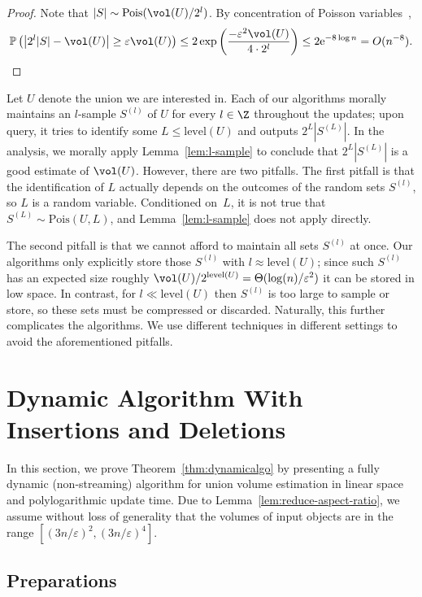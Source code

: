 \documentclass[a4paper, 11pt]{article}
\newcommand{\qedhere}{}
\newcommand{\Pois}{\mathrm{Pois}}
\newcommand{\level}{\mathrm{level}}
\newcommand{\eps}{\varepsilon}
\renewcommand{\Pr}{\mathbb{P}}
\begin{document}
\begin{proof}
    Note that $|S| \sim \Pois(\vol(U)/2^l)$. By concentration of Poisson variables~\cite{Canonne19},
    \[
        \Pr \left( \left| 2^l |S| - \vol(U) \right| \geq \eps \vol(U) \right)
        \leq 2\exp\left( \frac{-\eps^2 \vol(U)}{4 \cdot 2^l} \right)
        \leq 2\mathrm{e}^{-8 \log n} = O(n^{-8}).\qedhere
    \]
    \aftermath
\end{proof}

Let $U$ denote the union we are interested in. Each of our algorithms morally maintains an $l$-sample $S^{(l)}$ of $U$ for every $l \in \Z$ throughout the updates; upon query, it tries to identify some $L \leq \level(U)$ and outputs $2^L |S^{(L)}|$. In the analysis, we morally apply Lemma~\ref{lem:l-sample} to conclude that $2^L |S^{(L)}|$ is a good estimate of $\vol(U)$. However, there are two pitfalls. The first pitfall is that the identification of $L$ actually depends on the outcomes of the random sets $S^{(l)}$, so $L$ is a random variable. Conditioned on~$L$, it is not true that $S^{(L)} \sim \Pois(U, L)$, and Lemma~\ref{lem:l-sample} does not apply directly.

The second pitfall is that we cannot afford to maintain all sets $S^{(l)}$ at once. Our algorithms only explicitly store those $S^{(l)}$ with $l \approx \level(U)$; since such $S^{(l)}$ has an expected size roughly $\vol(U)/2^{\level(U)} = \Theta(\log(n)/\eps^2)$ it can be stored in low space. In contrast, for $l \ll \level(U)$ then $S^{(l)}$ is too large to sample or store, so these sets must be compressed or discarded. Naturally, this further complicates the algorithms. We use different techniques in different settings to avoid the aforementioned pitfalls.

\section{Dynamic Algorithm With Insertions and Deletions}
\label{sec:dynamic}

In this section, we prove Theorem~\ref{thm:dynamicalgo} by presenting a fully dynamic (non-streaming) algorithm for union volume estimation in linear space and polylogarithmic update time. Due to Lemma~\ref{lem:reduce-aspect-ratio}, we assume without loss of generality that the volumes of input objects are in the range $[(3n/\eps)^2, (3n/\eps)^4]$.

\subsection{Preparations}
\end{document}

